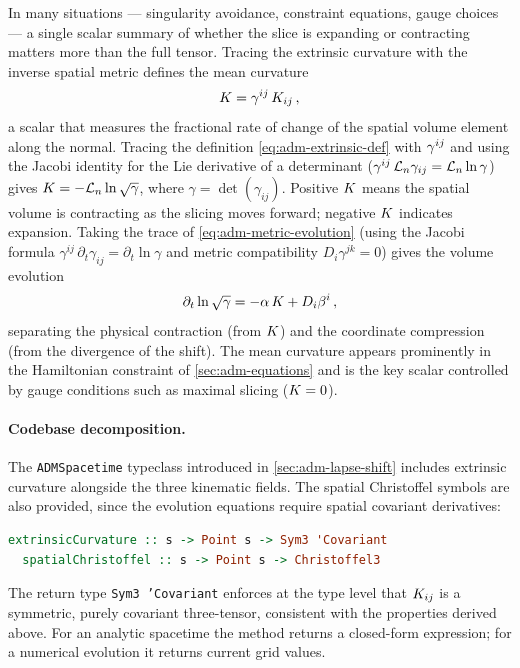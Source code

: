 In many situations --- singularity avoidance, constraint equations,
gauge choices --- a single scalar summary of whether the slice is
expanding or contracting matters more than the full tensor.  Tracing the
extrinsic curvature with the inverse spatial metric defines the mean
curvature
%
\begin{equation}
  K = \gamma^{ij}\,K_{ij} \,,
  \label{eq:adm-mean-curvature}
\end{equation}
%
a scalar that measures the fractional rate of change of the spatial
volume element along the normal.  Tracing the definition
\cref{eq:adm-extrinsic-def} with $\gamma^{ij}$ and using the
Jacobi identity for the Lie derivative of a determinant
($\gamma^{ij}\,\mathcal{L}_{n}\gamma_{ij} = \mathcal{L}_{n}\ln\gamma$) gives
$K = -\mathcal{L}_{n}\ln\sqrt{\gamma}$, where
$\gamma = \det(\gamma_{ij})$.  Positive $K$ means the
spatial volume is contracting as the slicing moves forward; negative
$K$ indicates expansion.  Taking the trace of
\cref{eq:adm-metric-evolution} (using the Jacobi formula
$\gamma^{ij}\,\partial_t\gamma_{ij} = \partial_t\ln\gamma$ and
metric compatibility $D_i\gamma^{jk} = 0$) gives the volume evolution
%
\begin{equation}
  \partial_t \ln\sqrt{\gamma}
  = -\alpha\,K + D_i\beta^i \,,
  \label{eq:adm-volume-evolution}
\end{equation}
%
separating the physical contraction (from $K$) and the
coordinate compression (from the divergence of the shift).  The mean
curvature appears prominently in the Hamiltonian constraint of
\cref{sec:adm-equations} and is the key scalar controlled by
gauge conditions such as maximal slicing ($K = 0$).

\paragraph{Codebase decomposition.}

The \texttt{ADMSpacetime} typeclass introduced in
\cref{sec:adm-lapse-shift} includes extrinsic curvature alongside the
three kinematic fields.  The spatial Christoffel symbols are also
provided, since the evolution equations require spatial covariant
derivatives:
%
\begin{lstlisting}[language=Haskell]
  extrinsicCurvature :: s -> Point s -> Sym3 'Covariant
  spatialChristoffel :: s -> Point s -> Christoffel3
\end{lstlisting}
%
The return type \texttt{Sym3 'Covariant} enforces at the type level that
$K_{ij}$ is a symmetric, purely covariant three-tensor, consistent
with the properties derived above.  For an analytic spacetime the method
returns a closed-form expression; for a numerical evolution it returns
current grid values.
